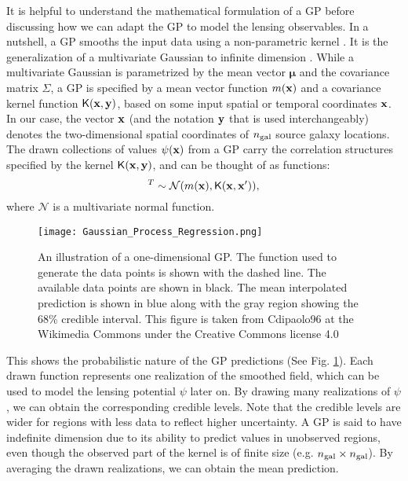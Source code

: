 It is helpful to understand the mathematical formulation of a GP 
before discussing how we can adapt the GP to model the lensing observables. 
In a nutshell, a GP smooths the input data using a non-parametric kernel
\citep{Hastie1990}. 
It is the generalization of a multivariate Gaussian 
to infinite dimension \citep{Rasmussen2006}. 
While a multivariate Gaussian is parametrized by  
the mean vector $\mathbf{\mu}$ and the covariance matrix $\Sigma$, 
a GP is specified by a mean vector function $m(\mathbf{x})$ and a
covariance kernel function $\mathsf{K}(\mathbf{x}, \mathbf{y})$, based on some input spatial or
temporal coordinates $\mathbf{x}$. In our case, the vector $\mathbf{x}$ (and the
 notation $\mathbf{y}$ that is used interchangeably) denotes the
two-dimensional spatial coordinates of $n_{\rm gal}$ source galaxy locations. 
The drawn collections of values $\psi(\mathbf{x})$ from a GP carry the correlation structures
specified by the kernel $\mathsf{K}(\mathbf{x}, \mathbf{y})$, and can be thought of as
functions: 
\begin{equation}
	[\psi_1(\xv), \psi_2(\xv) \ldots, \psi_m(\xv) ]^T \sim \mathcal{N}(m(\xv),
	\kerngp(\xv, \xv')),
		\label{eq:GP}
\end{equation}
where $\mathcal{N}$ is a multivariate normal function.
\begin{figure}
	\centering
	\texttt{[image: Gaussian\_Process\_Regression.png]}
	\caption{An illustration of a one-dimensional GP. The
		function used to generate the data points 
		is shown with the dashed line. The available data points are shown in
		black. The mean interpolated prediction is shown in blue
		along with the gray region showing the 68\% 
		credible interval. This figure is taken from Cdipaolo96 at 
		the Wikimedia Commons under the Creative Commons license 4.0
\label{fig:one_d_gaussian_process}}
\end{figure}
This shows the probabilistic nature of the GP predictions
(See Fig. \ref{fig:one_d_gaussian_process}).
Each drawn function represents one realization of the smoothed
field, which can be used to model the lensing potential $\psi$ later on. 
By drawing many realizations of $\psi$, we can obtain the
corresponding credible levels.
Note that the credible levels are wider for regions with less data to reflect
higher uncertainty. A GP is said to have indefinite dimension due to its ability to
predict values in unobserved regions, even though the 
observed part of the kernel is of finite size (e.g. $n_{\rm gal} \times n_{\rm gal}$). 
By averaging the drawn realizations, we can
obtain the mean prediction. 



